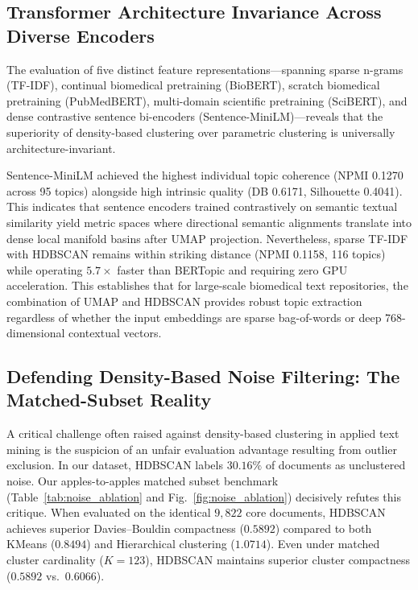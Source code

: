 \documentclass[a4paper,10pt,conference]{IEEEtran}
\begin{document}
\subsection{Transformer Architecture Invariance Across Diverse Encoders}

The evaluation of five distinct feature representations—spanning sparse n-grams (TF-IDF), continual biomedical pretraining (BioBERT), scratch biomedical pretraining (PubMedBERT), multi-domain scientific pretraining (SciBERT), and dense contrastive sentence bi-encoders (Sentence-MiniLM)—reveals that the superiority of density-based clustering over parametric clustering is universally architecture-invariant. 

Sentence-MiniLM achieved the highest individual topic coherence (NPMI 0.1270 across 95 topics) alongside high intrinsic quality (DB 0.6171, Silhouette 0.4041). This indicates that sentence encoders trained contrastively on semantic textual similarity yield metric spaces where directional semantic alignments translate into dense local manifold basins after UMAP projection. Nevertheless, sparse TF-IDF with HDBSCAN remains within striking distance (NPMI 0.1158, 116 topics) while operating $5.7\times$ faster than BERTopic and requiring zero GPU acceleration. This establishes that for large-scale biomedical text repositories, the combination of UMAP and HDBSCAN provides robust topic extraction regardless of whether the input embeddings are sparse bag-of-words or deep 768-dimensional contextual vectors.

\subsection{Defending Density-Based Noise Filtering: The Matched-Subset Reality}

A critical challenge often raised against density-based clustering in applied text mining is the suspicion of an unfair evaluation advantage resulting from outlier exclusion. In our dataset, HDBSCAN labels $30.16\%$ of documents as unclustered noise. Our apples-to-apples matched subset benchmark (Table~\ref{tab:noise_ablation} and Fig.~\ref{fig:noise_ablation}) decisively refutes this critique. When evaluated on the identical $9{,}822$ core documents, HDBSCAN achieves superior Davies--Bouldin compactness ($0.5892$) compared to both KMeans ($0.8494$) and Hierarchical clustering ($1.0714$). Even under matched cluster cardinality ($K=123$), HDBSCAN maintains superior cluster compactness ($0.5892$ vs.\ $0.6066$).
\end{document}
